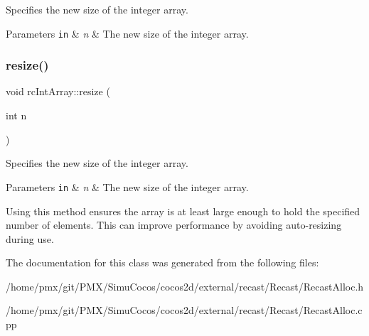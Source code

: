 Specifies the new size of the integer array. 
\begin{DoxyParams}[1]{Parameters}
\mbox{\tt in}  & {\em n} & The new size of the integer array. \\
\hline
\end{DoxyParams}
\mbox{\label{classrcIntArray_a2135fb43dd504939a2eadbb78650c155}} 
\subsubsection{\texorpdfstring{resize()}{resize()}\hspace{0.1cm}{\footnotesize\ttfamily [2/2]}}
{\footnotesize\ttfamily void rc\+Int\+Array\+::resize (\begin{DoxyParamCaption}\item[{int}]{n }\end{DoxyParamCaption})}

Specifies the new size of the integer array. 
\begin{DoxyParams}[1]{Parameters}
\mbox{\tt in}  & {\em n} & The new size of the integer array.\\
\hline
\end{DoxyParams}
\begin{DoxyParagraph}{}

\end{DoxyParagraph}
Using this method ensures the array is at least large enough to hold the specified number of elements. This can improve performance by avoiding auto-\/resizing during use. 

The documentation for this class was generated from the following files\+:\begin{DoxyCompactItemize}
\item 
/home/pmx/git/\+P\+M\+X/\+Simu\+Cocos/cocos2d/external/recast/\+Recast/Recast\+Alloc.\+h\item 
/home/pmx/git/\+P\+M\+X/\+Simu\+Cocos/cocos2d/external/recast/\+Recast/Recast\+Alloc.\+cpp\end{DoxyCompactItemize}
